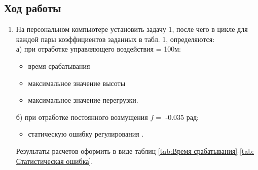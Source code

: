 \documentclass[a4paper,12pt]{article}
\begin{document}
    \subsection{Ход работы}
    
    \begin{enumerate}
    \item На персональном компьютере установить задачу 1, после чего в цикле для
    каждой   пары   коэффициентов  заданных   в  табл.   1,
    определяются:\\
    а)	при отработке управляющего воздействия  = 100м:
        \begin{itemize}
            \item время срабатывания   
            \item максимальное значение высоты  
            \item максимальное значение перегрузки.
        \end{itemize}
    б)	при отработке постоянного возмущения $f=$ -0.035 рад:
        \begin{itemize}
            \item статическую ошибку регулирования .
        \end{itemize}
    
    Результаты расчетов оформить в виде таблиц \ref{tab:Время срабатывания}-\ref{tab: Статистическая ошибка}.


\end{enumerate}
\end{document}
